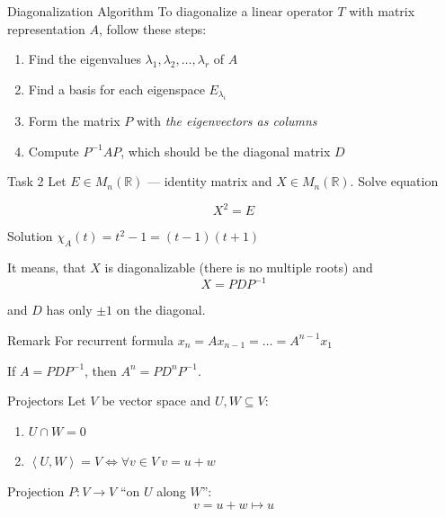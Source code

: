 \documentclass[fullscreen=true, bookmarks=true, hyperref={pdfencoding=unicode}]{beamer}
\begin{document}
\begin{frame}{Diagonalization Algorithm}
  To diagonalize a linear operator $T$ with matrix representation $A$, follow these steps:
  
  \begin{enumerate}
    \item Find the eigenvalues $\lambda_1, \lambda_2, \dots, \lambda_r$ of $A$
    \item Find a basis for each eigenspace $E_{\lambda_i}$
    \item Form the matrix $P$ with \emph{the eigenvectors as columns}
    \item Compute $P^{-1} A P$, which should be the diagonal matrix $D$
  \end{enumerate}
\end{frame}


\begin{frame}{Task 2}
  Let $E \in {M}_n (\mathbb{R})$ — identity matrix and $X \in {M}_n (\mathbb{R})$. Solve equation 

  $$X^2 = E$$
  \pause

  \begin{block}{Solution}
    $\chi_A (t) = t^2 - 1 = (t-1)(t+1)$

    It means, that $X$ is diagonalizable (there is no multiple roots) 
    and $$X = PDP^{-1}$$

    and $D$ has only $\pm 1$ on the diagonal.
  \end{block}

  \pause
  \begin{block}{Remark}
    For recurrent formula
    $ x_n = Ax_{n-1} = \dots = A^{n-1}x_1 $
  
    If $A=PDP^{-1}$, then $A^n=PD^nP^{-1}$.
  \end{block}
\end{frame}


\begin{frame}{Projectors}
  Let $V$ be vector space and $U, W \subseteq V$:
  \begin{enumerate}
    \item $U \cap W = 0$
    \item $\left< U, W \right> = V \Leftrightarrow \forall v \in V\ v = u + w$
  \end{enumerate}

  \vspace{1cm}
  \pause
  Projection $P: V \to V$ ``on $U$ along $W$'':
  $$v= u+w \mapsto u$$

\end{frame}
\end{document}
